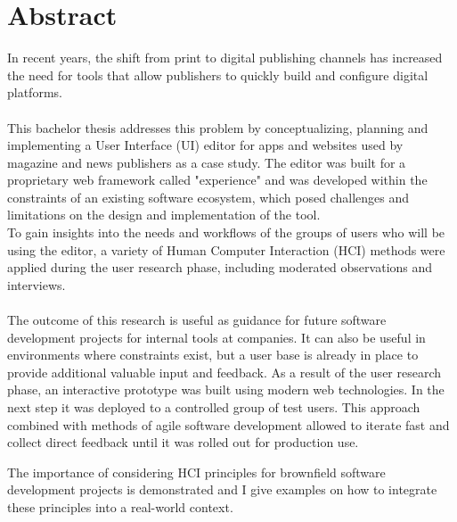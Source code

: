 %

\chapter*{Abstract}
In recent years, the shift from print to digital publishing channels has increased the need for tools that allow publishers to quickly build and configure digital platforms.
\\\\
This bachelor thesis addresses this problem by conceptualizing, planning and implementing a User Interface (UI) editor for apps and websites used by magazine and news publishers as a case study.
The editor was built for a proprietary web framework called "\Gls{experience}" and was developed within the constraints of an existing software ecosystem, which posed challenges and limitations on the design and implementation of the tool.
\\
To gain insights into the needs and workflows of the groups of users who will be using the editor, a variety of Human Computer Interaction (HCI) methods were applied during the user research phase, including moderated observations and interviews. 
\\\\
The outcome of this research is useful as guidance for future software development projects for internal tools at companies. It can also be useful in environments where constraints exist, but a user base is already in place to provide additional valuable input and feedback.
As a result of the user research phase, an interactive prototype was built using modern web technologies.
In the next step it was deployed to a controlled group of test users.
This approach combined with methods of agile software development allowed to iterate fast and collect direct feedback until it was rolled out for production use.

The importance of considering HCI principles for brownfield software development projects is demonstrated and I give examples on how to integrate these principles into a real-world context.